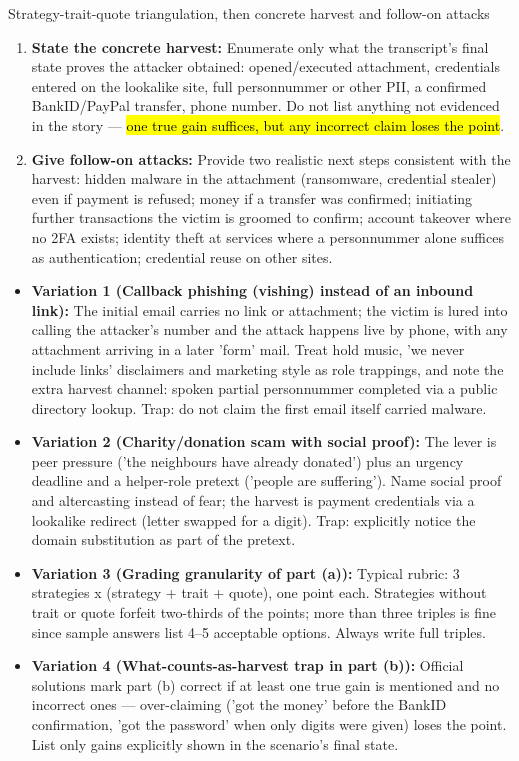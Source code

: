 \documentclass[12pt, a4paper]{article}
\newcommand{\imp}[1]{\hl{#1}}                       %
\begin{document}
\begin{schemebox}{Strategy-trait-quote triangulation, then concrete harvest and follow-on attacks}
\begin{enumerate}[label=\textbf{Step \arabic*:}, leftmargin=*]
    \item \textbf{State the concrete harvest:} Enumerate only what the transcript's final state proves the attacker obtained: opened/executed attachment, credentials entered on the lookalike site, full personnummer or other PII, a confirmed BankID/PayPal transfer, phone number.
    Do not list anything not evidenced in the story --- \imp{one true gain suffices, but any incorrect claim loses the point}.
    \item \textbf{Give follow-on attacks:} Provide two realistic next steps consistent with the harvest: hidden malware in the attachment (ransomware, credential stealer) even if payment is refused; money if a transfer was confirmed; initiating further transactions the victim is groomed to confirm;
    account takeover where no 2FA exists; identity theft at services where a personnummer alone suffices as authentication; credential reuse on other sites.
\end{enumerate}
\end{schemebox}

\begin{trapbox}
\begin{itemize}
    \item \textbf{Variation 1 (Callback phishing (vishing) instead of an inbound link):} The initial email carries no link or attachment; the victim is lured into calling the attacker's number and the attack happens live by phone, with any attachment arriving in a later 'form' mail.
    Treat hold music, 'we never include links' disclaimers and marketing style as role trappings, and note the extra harvest channel: spoken partial personnummer completed via a public directory lookup. Trap: do not claim the first email itself carried malware.
    \item \textbf{Variation 2 (Charity/donation scam with social proof):} The lever is peer pressure ('the neighbours have already donated') plus an urgency deadline and a helper-role pretext ('people are suffering').
    Name social proof and altercasting instead of fear; the harvest is payment credentials via a lookalike redirect (letter swapped for a digit). Trap: explicitly notice the domain substitution as part of the pretext.
    \item \textbf{Variation 3 (Grading granularity of part (a)):} Typical rubric: 3 strategies x (strategy + trait + quote), one point each. Strategies without trait or quote forfeit two-thirds of the points; more than three triples is fine since sample answers list 4--5 acceptable options. Always write full triples.
    \item \textbf{Variation 4 (What-counts-as-harvest trap in part (b)):} Official solutions mark part (b) correct if at least one true gain is mentioned and no incorrect ones --- over-claiming ('got the money' before the BankID confirmation, 'got the password' when only digits were given) loses the point. List only gains explicitly shown in the scenario's final state.
\end{itemize}
\end{trapbox}
\end{document}

